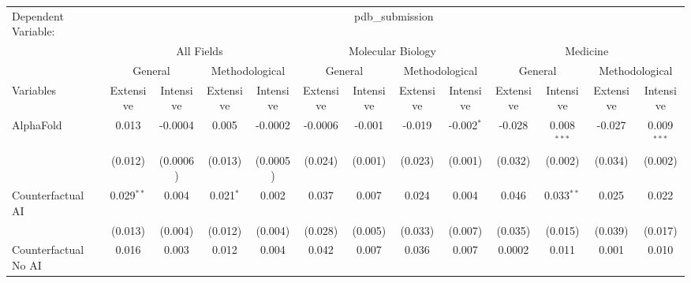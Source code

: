 \begingroup
\centering
\begin{tabular}{lcccccccccccc}
   \tabularnewline \midrule \midrule
   Dependent Variable: & \multicolumn{12}{c}{pdb\_submission}\\
 & \multicolumn{4}{c}{All Fields} & \multicolumn{4}{c}{Molecular Biology} & \multicolumn{4}{c}{Medicine} \\
\cmidrule(lr){2-5} \cmidrule(lr){6-9} \cmidrule(lr){10-13}
 & \multicolumn{2}{c}{General} & \multicolumn{2}{c}{Methodological} & \multicolumn{2}{c}{General} & \multicolumn{2}{c}{Methodological} & \multicolumn{2}{c}{General} & \multicolumn{2}{c}{Methodological} \\
\cmidrule(lr){2-3} \cmidrule(lr){4-5} \cmidrule(lr){6-7} \cmidrule(lr){8-9} \cmidrule(lr){10-11} \cmidrule(lr){12-13}
Variables & \multicolumn{1}{c}{Extensive} & \multicolumn{1}{c}{Intensive} & \multicolumn{1}{c}{Extensive} & \multicolumn{1}{c}{Intensive} & \multicolumn{1}{c}{Extensive} & \multicolumn{1}{c}{Intensive} & \multicolumn{1}{c}{Extensive} & \multicolumn{1}{c}{Intensive} & \multicolumn{1}{c}{Extensive} & \multicolumn{1}{c}{Intensive} & \multicolumn{1}{c}{Extensive} & \multicolumn{1}{c}{Intensive} \\
\cmidrule(lr){1-1}\cmidrule(lr){2-2} \cmidrule(lr){3-3} \cmidrule(lr){4-4} \cmidrule(lr){5-5} \cmidrule(lr){6-6} \cmidrule(lr){7-7} \cmidrule(lr){8-8} \cmidrule(lr){9-9} \cmidrule(lr){10-10} \cmidrule(lr){11-11} \cmidrule(lr){12-12} \cmidrule(lr){13-13}
   AlphaFold                                & 0.013        & -0.0004  & 0.005       & -0.0002  & -0.0006 & -0.001   & -0.019  & -0.002$^{*}$ & -0.028  & 0.008$^{***}$ & -0.027  & 0.009$^{***}$\\   
                                            & (0.012)      & (0.0006) & (0.013)     & (0.0005) & (0.024) & (0.001)  & (0.023) & (0.001)      & (0.032) & (0.002)       & (0.034) & (0.002)\\   
   Counterfactual AI                        & 0.029$^{**}$ & 0.004    & 0.021$^{*}$ & 0.002    & 0.037   & 0.007    & 0.024   & 0.004        & 0.046   & 0.033$^{**}$  & 0.025   & 0.022\\   
                                            & (0.013)      & (0.004)  & (0.012)     & (0.004)  & (0.028) & (0.005)  & (0.033) & (0.007)      & (0.035) & (0.015)       & (0.039) & (0.017)\\   
   Counterfactual No AI                     & 0.016        & 0.003    & 0.012       & 0.004    & 0.042   & 0.007    & 0.036   & 0.007        & 0.0002  & 0.011         & 0.001   & 0.010\\   

\end{tabular}
